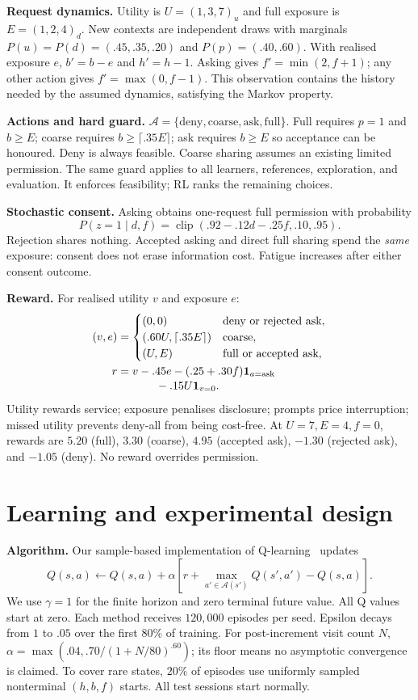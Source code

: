 \documentclass[10pt,a4paper,twocolumn]{article}
\newcommand{\ind}{\mathbf{1}}
\begin{document}
\textbf{Request dynamics.} Utility is $U=(1,3,7)_u$ and full exposure is $E=(1,2,4)_d$. New contexts are independent draws with marginals $P(u)=P(d)=(.45,.35,.20)$ and $P(p)=(.40,.60)$. With realised exposure $e$, $b'=b-e$ and $h'=h-1$. Asking gives $f'=\min(2,f+1)$; any other action gives $f'=\max(0,f-1)$. This observation contains the history needed by the assumed dynamics, satisfying the Markov property.

\textbf{Actions and hard guard.} $\mathcal A=\{\text{deny},\text{coarse},\text{ask},\text{full}\}$. Full requires $p=1$ and $b\ge E$; coarse requires $b\ge\lceil.35E\rceil$; ask requires $b\ge E$ so acceptance can be honoured. Deny is always feasible. Coarse sharing assumes an existing limited permission. The same guard applies to all learners, references, exploration, and evaluation. It enforces feasibility; RL ranks the remaining choices.

\textbf{Stochastic consent.} Asking obtains one-request full permission with probability
\[
P(z=1\mid d,f)=\operatorname{clip}(.92-.12d-.25f,.10,.95).
\]
Rejection shares nothing. Accepted asking and direct full sharing spend the \emph{same} exposure: consent does not erase information cost. Fatigue increases after either consent outcome.

\textbf{Reward.} For realised utility $v$ and exposure $e$:
\begin{align*}
(v,e)&=\begin{cases}
(0,0)&\text{deny or rejected ask},\\
(.60U,\lceil.35E\rceil)&\text{coarse},\\
(U,E)&\text{full or accepted ask},
\end{cases}\\[-1pt]
r&=v-.45e-(.25+.30f)\ind_{a=\mathrm{ask}}\\[-2pt]
&\hspace{12mm}-.15U\ind_{v=0}.
\end{align*}
Utility rewards service; exposure penalises disclosure; prompts price interruption; missed utility prevents deny-all from being cost-free. At $U=7,E=4,f=0$, rewards are $5.20$ (full), $3.30$ (coarse), $4.95$ (accepted ask), $-1.30$ (rejected ask), and $-1.05$ (deny). No reward overrides permission.

\section{Learning and experimental design}
\textbf{Algorithm.} Our sample-based implementation of Q-learning~\cite{watkins,sutton} updates
\[
Q(s,a)\leftarrow Q(s,a)+\alpha\left[r+\max_{a'\in\mathcal A(s')}Q(s',a')-Q(s,a)\right].
\]
We use $\gamma=1$ for the finite horizon and zero terminal future value. All Q values start at zero. Each method receives $120{,}000$ episodes per seed. Epsilon decays from $1$ to $.05$ over the first $80\%$ of training. For post-increment visit count $N$, $\alpha=\max(.04,.70/(1+N/80)^{.60})$; its floor means no asymptotic convergence is claimed. To cover rare states, $20\%$ of episodes use uniformly sampled nonterminal $(h,b,f)$ starts. All test sessions start normally.
\end{document}
